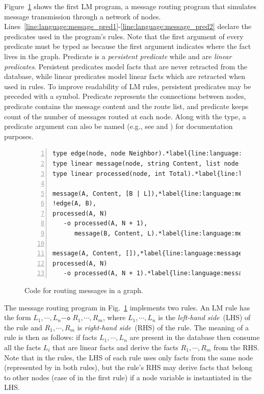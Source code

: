 
Figure~\ref{code:language:message} shows the first LM program, a message routing
program that simulates message transmission through a network of nodes.
Lines~\ref{line:language:message_pred1}-\ref{line:language:message_pred2}
declare the predicates used in the program's rules. Note that the first argument
of every predicate must be typed as  because the first argument
indicates where the fact lives in the graph. Predicate  is a
\emph{persistent predicate} while  and  are
\emph{linear predicates}. Persistent predicates model facts that are never
retracted from the database, while linear predicates model linear facts which
are retracted when used in rules. To improve readability of LM rules, persistent
predicates may be preceded with a \code{!} symbol. Predicate 
represents the connections between nodes, predicate  contains the
message content and the route list, and predicate  keeps count
of the number of messages routed at each node. Along with the type, a predicate
argument can also be named (e.g., see  and ) for
documentation purposes.

\begin{figure}[h!]
\begin{Verbatim}[numbers=left,commandchars=\*\{\},fontsize=\codesize]
type edge(node, node Neighbor).*label{line:language:message_pred1}*hfill// Predicate declaration
type linear message(node, string Content, list node Routing).
type linear processed(node, int Total).*label{line:language:message_pred2}

message(A, Content, [B | L]),*label{line:language:message_first1}*hfill// Rule 1
!edge(A, B),
processed(A, N)
   -o processed(A, N + 1),
      message(B, Content, L).*label{line:language:message_first2}

message(A, Content, []),*label{line:language:message_second1}*hfill// Rule 2
processed(A, N)
   -o processed(A, N + 1).*label{line:language:message_second2}
\end{Verbatim}
\caption{Code for routing messages in a graph.}
\label{code:language:message}
\end{figure}

The message routing program in Fig.~\ref{code:language:message} implements two
rules. An LM rule has the form $L_1, \cdots, L_n \mathtt{-o} \; R_1, \cdots,
R_m$, where $L_1, \cdots, L_n$ is the \emph{left-hand side}~(LHS) of the rule
and $R_1, \cdots, R_m$ is \emph{right-hand side}~(RHS) of the rule. The meaning
of a rule is then as follows: if facts $L_1, \cdots, L_n$ are present in the
database then consume all the facts $L_i$ that are linear facts and derive the
facts $R_1, \cdots, R_m$ from the RHS. Note that in the rules, the LHS of each
rule uses only facts from the same node (represented by  in both rules),
but the rule's RHS may derive facts that belong to other nodes (case of 
in the first rule) if a node variable is instantiated in the LHS.

